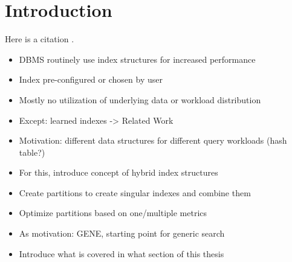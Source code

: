 \chapter{Introduction}

Here is a citation \cite{btree}.
\begin{itemize}
    \item DBMS routinely use index structures for increased performance
    \item Index pre-configured or chosen by user
    \item Mostly no utilization of underlying data or workload distribution
    \item Except: learned indexes -> Related Work
    \item Motivation: different data structures for different query workloads (hash table?)
    \item For this, introduce concept of hybrid index structures
    \item Create partitions to create singular indexes and combine them
    \item Optimize partitions based on one/multiple metrics
    \item As motivation: GENE, starting point for generic search
    \item Introduce what is covered in what section of this thesis
\end{itemize}